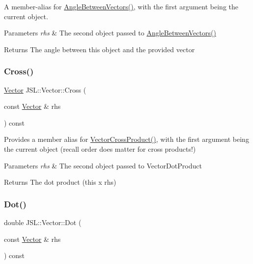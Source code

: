 A member-\/alias for \hyperlink{namespaceJSL_a09355c91f84fd99d4634bf9189fef51d}{Angle\+Between\+Vectors()}, with the first argument being the current object. 


\begin{DoxyParams}{Parameters}
{\em rhs} & The second object passed to \hyperlink{namespaceJSL_a09355c91f84fd99d4634bf9189fef51d}{Angle\+Between\+Vectors()} \\
\hline
\end{DoxyParams}
\begin{DoxyReturn}{Returns}
The angle between this object and the provided vector 
\end{DoxyReturn}
\mbox{\label{classJSL_1_1Vector_a59ff98a99ebcf2b589290b9e57b8e184}} 
\subsubsection{\texorpdfstring{Cross()}{Cross()}}
{\footnotesize\ttfamily \hyperlink{classJSL_1_1Vector}{Vector} J\+S\+L\+::\+Vector\+::\+Cross (\begin{DoxyParamCaption}\item[{const \hyperlink{classJSL_1_1Vector}{Vector} \&}]{rhs }\end{DoxyParamCaption}) const\hspace{0.3cm}{\ttfamily [inline]}}



Provides a member alias for \hyperlink{namespaceJSL_aa7816eb0cd81b74241ce460237990e70}{Vector\+Cross\+Product()}, with the first argument being the current object (recall order does matter for cross products!) 


\begin{DoxyParams}{Parameters}
{\em rhs} & The second object passed to Vector\+Dot\+Product \\
\hline
\end{DoxyParams}
\begin{DoxyReturn}{Returns}
The dot product (this x rhs) 
\end{DoxyReturn}
\mbox{\label{classJSL_1_1Vector_a60660b5a26e0ddace46f31699834b671}} 
\subsubsection{\texorpdfstring{Dot()}{Dot()}}
{\footnotesize\ttfamily double J\+S\+L\+::\+Vector\+::\+Dot (\begin{DoxyParamCaption}\item[{const \hyperlink{classJSL_1_1Vector}{Vector} \&}]{rhs }\end{DoxyParamCaption}) const\hspace{0.3cm}{\ttfamily [inline]}}



